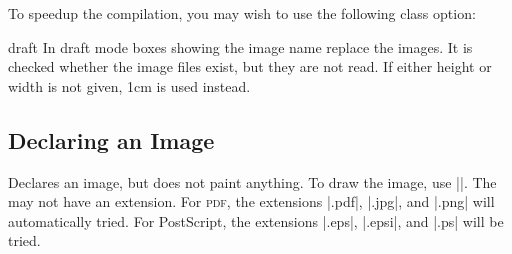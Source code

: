 To speedup the compilation, you may wish to use the following class option:
%
\begin{packageoption}{draft}
    In draft mode boxes showing the image name replace the images. It is
    checked whether the image files exist, but they are not read. If either
    height or width is not given, 1cm is used instead.
\end{packageoption}


\subsection{Declaring an Image}

\begin{command}{\pgfdeclareimage{}}
    Declares an image, but does not paint anything. To draw the image, use
    ||. The  may not have an
    extension.  For \textsc{pdf}, the extensions |.pdf|, |.jpg|, and |.png|
    will automatically tried. For PostScript, the extensions |.eps|, |.epsi|,
    and |.ps| will be tried.


\end{command}

